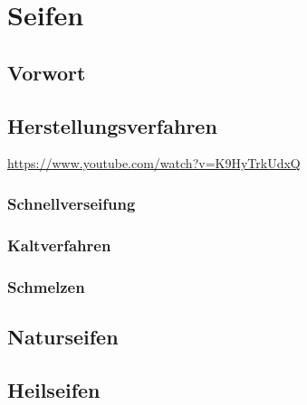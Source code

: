 \chapter{Seifen}

\section{Vorwort}


\lipsum[1-5]
\newpage


\section{Herstellungsverfahren}
\url{https://www.youtube.com/watch?v=K9HyTrkUdxQ}



\subsection{Schnellverseifung}

\subsection{Kaltverfahren}

\subsection{Schmelzen}


\section{Naturseifen}


\section{Heilseifen}



